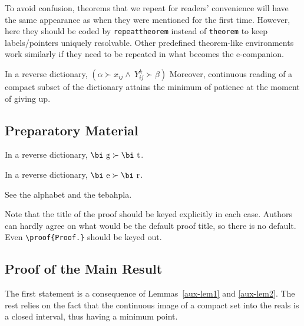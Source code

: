 \documentclass[poms,final,nonblindrev]{poms1_V1} %
\begin{document}
To avoid confusion, theorems that we repeat for readers' convenience
will have the same appearance as when they were mentioned for the first
time. However, here they should be coded by \verb+repeattheorem+ instead
of \verb+theorem+ to keep labels/pointers uniquely resolvable. Other predefined theorem-like
environments work similarly if they need to be repeated in what becomes the \mbox{e-companion.}


\begin{repeattheorem}[Theorem 1.]
    In a reverse dictionary,  $(\alpha \succ x_{ij} \land\ Y^k_{ij} \succ \beta)$
    Moreover, continuous reading of a compact subset of the dictionary  attains the minimum of patience at the moment of giving up.
\end{repeattheorem}

\subsection{Preparatory Material}

\begin{lemma}
    \label{aux-lem1}
    In a reverse dictionary, $\mbox{\bi g}\succ\mbox{\bi t\/}$.
\end{lemma}

\begin{lemma}
    \label{aux-lem2}
    In a reverse dictionary, $\mbox{\bi e}\succ\mbox{\bi r\/}$.
\end{lemma}

 See the alphabet and the tebahpla.\Halmos
\endproof

\begin{remark}
    Note that the title of the proof should be keyed
    explicitly in each case. Authors can hardly agree on what would be the
    default proof title, so there is no default. Even \verb+\proof{Proof.}+ should be keyed out.
\end{remark}


\subsection{Proof of the Main Result}

 The first statement is a consequence of
Lemmas~\ref{aux-lem1} and \ref{aux-lem2}. The rest relies on the fact that the continuous
image of a compact set into the reals is a closed interval, thus having
a minimum point. \Halmos  
\endproof
\end{document}
